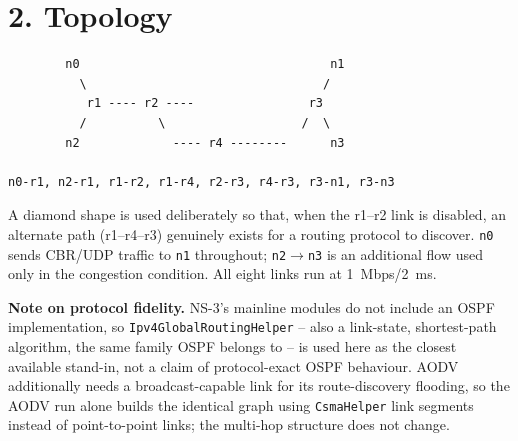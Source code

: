 \documentclass[11pt]{article}
\begin{document}
\section*{2. Topology}
\begin{center}
\begin{verbatim}
        n0                                   n1
          \                                 /
           r1 ---- r2 ----                r3
          /          \                   /  \
        n2             ---- r4 --------      n3

n0-r1, n2-r1, r1-r2, r1-r4, r2-r3, r4-r3, r3-n1, r3-n3
\end{verbatim}
\end{center}
A diamond shape is used deliberately so that, when the r1--r2 link is
disabled, an alternate path (r1--r4--r3) genuinely exists for a routing
protocol to discover. \texttt{n0} sends CBR/UDP traffic to \texttt{n1}
throughout; \texttt{n2}$\to$\texttt{n3} is an additional flow used only in
the congestion condition. All eight links run at 1~Mbps/2~ms.

\textbf{Note on protocol fidelity.} NS-3's mainline modules do not include an
OSPF implementation, so \texttt{Ipv4GlobalRoutingHelper} -- also a
link-state, shortest-path algorithm, the same family OSPF belongs to -- is
used here as the closest available stand-in, not a claim of protocol-exact
OSPF behaviour. AODV additionally needs a broadcast-capable link for its
route-discovery flooding, so the AODV run alone builds the identical graph
using \texttt{CsmaHelper} link segments instead of point-to-point links; the
multi-hop structure does not change.
\end{document}
